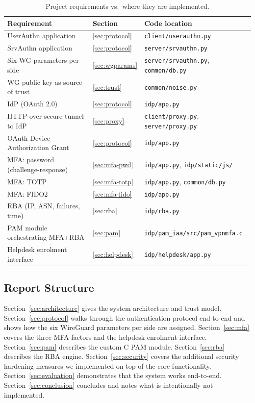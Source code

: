 \begin{table}[H]
\centering
\caption{Project requirements vs.\ where they are implemented.}
\label{tab:compliance}
\renewcommand{\arraystretch}{1.15}
\scriptsize
\begin{tabular}{p{3.0cm}p{1.2cm}p{3.2cm}}
\toprule
\textbf{Requirement} & \textbf{Section} & \textbf{Code location} \\
\midrule
UserAuthn application                        & \ref{sec:protocol} & \texttt{client/userauthn.py} \\
SrvAuthn application                         & \ref{sec:protocol} & \texttt{server/srvauthn.py} \\
Six WG parameters per side                   & \ref{sec:wgparams} & \texttt{server/srvauthn.py}, \texttt{common/db.py} \\
WG public key as source of trust             & \ref{sec:trust}    & \texttt{common/noise.py} \\
IdP (OAuth 2.0)                              & \ref{sec:protocol} & \texttt{idp/app.py} \\
HTTP-over-secure-tunnel to IdP               & \ref{sec:proxy}    & \texttt{client/proxy.py}, \texttt{server/proxy.py} \\
OAuth Device Authorization Grant             & \ref{sec:protocol} & \texttt{idp/app.py} \\
MFA: password (challenge-response)           & \ref{sec:mfa-pwd}  & \texttt{idp/app.py}, \texttt{idp/static/js/} \\
MFA: TOTP                                    & \ref{sec:mfa-totp} & \texttt{idp/app.py}, \texttt{common/db.py} \\
MFA: FIDO2                                   & \ref{sec:mfa-fido} & \texttt{idp/app.py} \\
RBA (IP, ASN, failures, time)                & \ref{sec:rba}      & \texttt{idp/rba.py} \\
PAM module orchestrating MFA+RBA             & \ref{sec:pam}      & \texttt{idp/pam\_iaa/src/pam\_vpnmfa.c} \\
Helpdesk enrolment interface                 & \ref{sec:helpdesk} & \texttt{idp/helpdesk/app.py} \\
\bottomrule
\end{tabular}
\end{table}

\subsection{Report Structure}
Section~\ref{sec:architecture} gives the system architecture and
trust model.
Section~\ref{sec:protocol} walks through the authentication protocol
end-to-end and shows how the six WireGuard parameters per side are
assigned.
Section~\ref{sec:mfa} covers the three MFA factors and the helpdesk
enrolment interface.
Section~\ref{sec:pam} describes the custom C PAM module.
Section~\ref{sec:rba} describes the RBA engine.
Section~\ref{sec:security} covers the additional security hardening
measures we implemented on top of the core functionality.
Section~\ref{sec:evaluation} demonstrates that the system works end-to-end.
Section~\ref{sec:conclusion} concludes and notes what is intentionally not
implemented.
